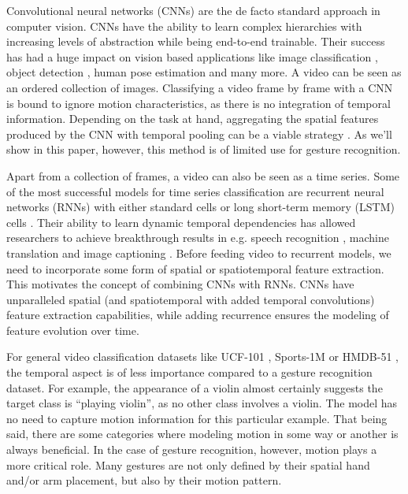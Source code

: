 \documentclass[11pt,a4paper]{article} \usepackage{a4wide}
\begin{document}
Convolutional neural networks (CNNs) \citep{lecun1998gradient} are the de facto standard approach in computer vision. 
CNNs have the ability to learn complex hierarchies with increasing levels of abstraction while being end-to-end trainable.
Their success has had a huge impact on vision based applications like image classification \citep{krizhevsky2012imagenet}, object detection \citep{sermanet2013overfeat}, human pose estimation \citep{toshev2014deeppose} and many more.  
A video can be seen as an ordered collection of images. 
Classifying a video frame by frame with a CNN is bound to ignore motion characteristics, as there is no integration of temporal information.
Depending on the task at hand, aggregating the spatial features produced by the CNN with temporal pooling can be a viable strategy \citep{karpathy2014large,ng2015beyond}. As we'll show in this paper, however, this method is of limited use for gesture recognition. 

Apart from a collection of frames, a video can also be seen as a time series.
Some of the most successful models for time series classification are recurrent neural networks (RNNs) with either standard cells or long short-term memory (LSTM) cells \citep{hochreiter1997long}.
Their ability to learn dynamic temporal dependencies has allowed researchers to achieve breakthrough results in e.g. speech recognition \citep{graves2013speech}, machine translation \citep{sutskever2014sequence} and image captioning \citep{vinyals2014show}.
Before feeding video to recurrent models, we need to incorporate some form of spatial or spatiotemporal feature extraction. This motivates the concept of combining CNNs with RNNs. CNNs have unparalleled spatial (and spatiotemporal with added temporal convolutions) feature extraction capabilities, while adding recurrence ensures the modeling of feature evolution over time.



For general video classification datasets like UCF-101 \citep{soomro2012ucf101}, Sports-1M \citep{karpathy2014large} or HMDB-51 \citep{kuehne2011hmdb}, the temporal aspect is of less importance compared to a gesture recognition dataset. For example, the appearance of a violin almost certainly suggests the target class is ``playing violin'', as no other class involves a violin. 
The model has no need to capture motion information for this particular example. 
That being said, there are some categories where modeling motion in some way or another is always beneficial. In the case of gesture recognition, however, motion plays a more critical role. Many gestures are not only defined by their spatial hand and/or arm placement, but also by their motion pattern.
\end{document}
